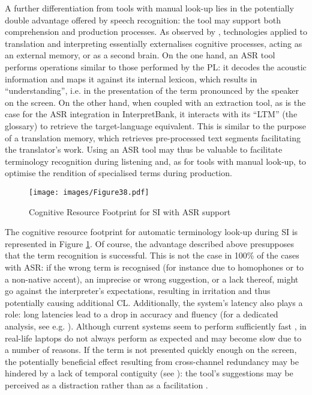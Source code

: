 A further differentiation from tools with manual look-up lies in the potentially double advantage offered by speech recognition: the tool may support both comprehension and production processes. As observed by \citet{pym_what_2011}, technologies applied to translation and interpreting essentially externalises cognitive processes, acting as an external memory, or as a second brain. On the one hand, an ASR tool performs operations similar to those performed by the PL: it decodes the acoustic information and maps it against its internal lexicon, which results in ``understanding'', i.e. in the presentation of the term pronounced by the speaker on the screen. On the other hand, when coupled with an extraction tool, as is the case for the ASR integration in InterpretBank, it interacts with its ``LTM'' (the glossary) to retrieve the target-language equivalent. This is similar to the purpose of a translation memory, which retrieves pre-processed text segments facilitating the translator's work. Using an ASR tool may thus be valuable to facilitate terminology recognition during listening and, as for tools with manual look-up, to optimise the rendition of specialised terms during production.

\begin{figure}
\texttt{[image: images/Figure38.pdf]}
\caption[Cognitive Resource Footprint for SI with ASR support]{Cognitive Resource Footprint for SI with ASR support}
\label{fig:CRF_SI_ASR}
\end{figure}

The cognitive resource footprint for automatic terminology look-up during SI is represented in Figure \ref{fig:CRF_SI_ASR}. Of course, the advantage described above presupposes that the term recognition is successful. This is not the case in 100\% of the cases with ASR: if the wrong term is recognised (for instance due to homophones or to a non-native accent), an imprecise or wrong suggestion, or a lack thereof, might go against the interpreter's expectations, resulting in irritation and thus potentially causing additional CL. Additionally, the system's latency also plays a role: long latencies lead to a drop in accuracy and fluency (for a dedicated analysis, see e.g. \citealt{montecchio_masterarbeit_maddalena_2021}). Although current systems seem to perform sufficiently fast \citep{brusewitz_simultandolmetschen_2019}, in real-life laptops do not always perform as expected and may become slow due to a number of reasons. If the term is not presented quickly enough on the screen, the potentially beneficial effect resulting from cross-channel redundancy may be hindered by a lack of temporal contiguity (see \citealt{mayer_principles_2014}): the tool's suggestions may be perceived as a distraction rather than as a facilitation \citep{van_cauwenberghe_etude_2020}.

